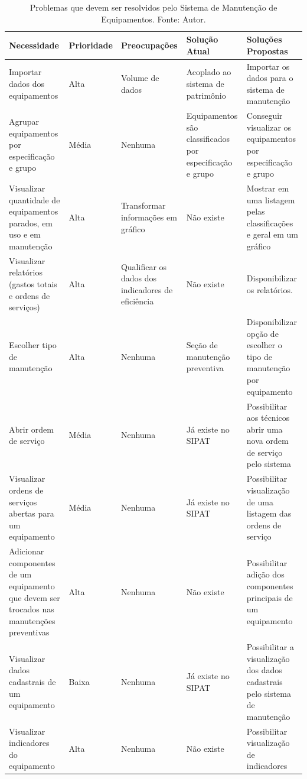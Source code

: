 \begin{table}[H]
\centering
\caption{Problemas que devem ser resolvidos pelo Sistema de Manutenção de Equipamentos. Fonte: Autor.}
\label{tab-necessidade}
\begin{tabular}{ | p{3cm} | p{2cm} | p{3cm} | p{3cm} | p{4cm} |}
\hline
	\textbf{Necessidade} & \textbf{Prioridade} & \textbf{Preocupações} & \textbf{Solução Atual} & \textbf{Soluções Propostas} \\ \hline
	Importar dados dos equipamentos & Alta & Volume de dados & Acoplado ao sistema de patrimônio & Importar os dados para o sistema de manutenção \\ \hline
	Agrupar equipamentos por especificação e grupo & Média & Nenhuma & Equipamentos são classificados por especificação e grupo & Conseguir visualizar os equipamentos por especificação e grupo \\ \hline
	Visualizar quantidade de equipamentos parados, em uso e em manutenção & Alta & Transformar informações em gráfico & Não existe & Mostrar em uma listagem pelas classificações e geral em um gráfico \\ \hline
	Visualizar relatórios (gastos totais e ordens de serviços) & Alta & Qualificar os dados dos indicadores de eficiência & Não existe & Disponibilizar os relatórios. \\ \hline
	Escolher tipo de manutenção & Alta & Nenhuma & Seção de manutenção preventiva & Disponibilizar opção de escolher o tipo de manutenção por equipamento \\ \hline
	Abrir ordem de serviço & Média & Nenhuma & Já existe no SIPAT & Possibilitar aos técnicos abrir uma nova ordem de serviço pelo sistema  \\ \hline
	Visualizar ordens de serviços abertas para um equipamento & Média & Nenhuma & Já existe no SIPAT & Possibilitar visualização de uma listagem das ordens de serviço \\ \hline
	Adicionar componentes de um equipamento que devem ser trocados nas manutenções preventivas & Alta & Nenhuma & Não existe & Possibilitar adição dos componentes principais de um equipamento \\ \hline
	Visualizar dados cadastrais de um equipamento & Baixa & Nenhuma & Já existe no SIPAT & Possibilitar a visualização dos dados cadastrais pelo sistema de manutenção \\ \hline
	Visualizar indicadores do equipamento & Alta & Nenhuma & Não existe & Possibilitar visualização de indicadores \\ \hline
\end{tabular}
\end{table}
 
